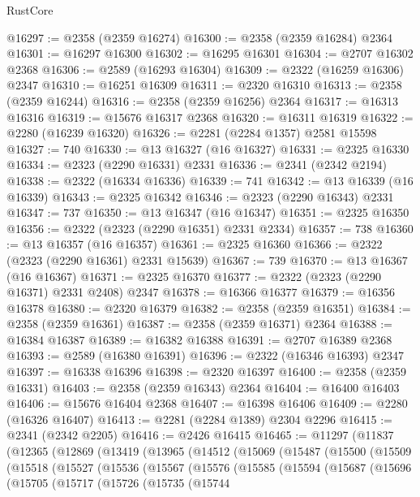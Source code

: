 \begin{lexlean}{RustCore}
\begin{coremodule}
@16297 := @2358 (@2359 @16274)
@16300 := @2358 (@2359 @16284) @2364
@16301 := @16297 @16300
@16302 := @16295 @16301
@16304 := @2707 @16302 @2368
@16306 := @2589 (@16293 @16304)
@16309 := @2322 (@16259 @16306) @2347
@16310 := @16251 @16309
@16311 := @2320 @16310
@16313 := @2358 (@2359 @16244)
@16316 := @2358 (@2359 @16256) @2364
@16317 := @16313 @16316
@16319 := @15676 @16317 @2368
@16320 := @16311 @16319
@16322 := @2280 (@16239 @16320)
@16326 := @2281 (@2284 @1357) @2581 @15598
@16327 := 740
@16330 := @13 @16327 (@16 @16327)
@16331 := @2325 @16330
@16334 := @2323 (@2290 @16331) @2331
@16336 := @2341 (@2342 @2194)
@16338 := @2322 (@16334 @16336)
@16339 := 741
@16342 := @13 @16339 (@16 @16339)
@16343 := @2325 @16342
@16346 := @2323 (@2290 @16343) @2331
@16347 := 737
@16350 := @13 @16347 (@16 @16347)
@16351 := @2325 @16350
@16356 := @2322 (@2323 (@2290 @16351) @2331 @2334)
@16357 := 738
@16360 := @13 @16357 (@16 @16357)
@16361 := @2325 @16360
@16366 := @2322 (@2323 (@2290 @16361) @2331 @15639)
@16367 := 739
@16370 := @13 @16367 (@16 @16367)
@16371 := @2325 @16370
@16377 := @2322 (@2323 (@2290 @16371) @2331 @2408) @2347
@16378 := @16366 @16377
@16379 := @16356 @16378
@16380 := @2320 @16379
@16382 := @2358 (@2359 @16351)
@16384 := @2358 (@2359 @16361)
@16387 := @2358 (@2359 @16371) @2364
@16388 := @16384 @16387
@16389 := @16382 @16388
@16391 := @2707 @16389 @2368
@16393 := @2589 (@16380 @16391)
@16396 := @2322 (@16346 @16393) @2347
@16397 := @16338 @16396
@16398 := @2320 @16397
@16400 := @2358 (@2359 @16331)
@16403 := @2358 (@2359 @16343) @2364
@16404 := @16400 @16403
@16406 := @15676 @16404 @2368
@16407 := @16398 @16406
@16409 := @2280 (@16326 @16407)
@16413 := @2281 (@2284 @1389) @2304 @2296
@16415 := @2341 (@2342 @2205)
@16416 := @2426 @16415
@16465 := @11297
    (@11837
      (@12365
        (@12869
          (@13419
            (@13965
              (@14512
                (@15069
                  (@15487
                    (@15500
                      (@15509
                        (@15518
                          (@15527
                            (@15536
                              (@15567
                                (@15576
                                  (@15585
                                    (@15594
                                      (@15687
                                        (@15696
                                          (@15705
                                            (@15717
                                              (@15726
                                                (@15735
                                                  (@15744

\end{coremodule}
\end{lexlean}
